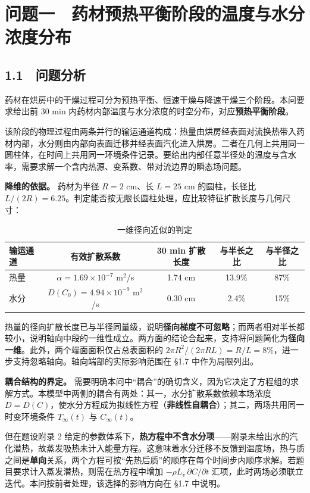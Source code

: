\documentclass[12pt,a4paper]{ctexart}
\begin{document}
\section*{问题一　药材预热平衡阶段的温度与水分浓度分布}

\subsection*{1.1　问题分析}

药材在烘房中的干燥过程可分为预热平衡、恒速干燥与降速干燥三个阶段。本问要求给出前 30 min 内药材内部温度与水分浓度的时空分布，对应\textbf{预热平衡阶段}。

该阶段的物理过程由两条并行的输运通道构成：热量由烘房经表面对流换热带入药材内部，水分则由内部向表面迁移并经表面汽化进入烘房。二者在几何上共用同一圆柱体，在时间上共用同一环境条件记录。要给出内部任意半径处的温度与含水率，需要求解一个含内热源、变系数、带对流边界的瞬态场问题。

\textbf{降维的依据。} 药材为半径 $R=2$ cm、长 $L=25$ cm 的圆柱，长径比 $L/(2R)=6.25$。判定能否按无限长圆柱处理，应比较特征扩散长度与几何尺寸：

\begin{table}[H]
\centering
\caption{一维径向近似的判定}
\small
\begin{tabular}{lcc c c}
\toprule
输运通道 & 有效扩散系数 & 30 min 扩散长度 & 与半长之比 & 与半径之比 \\
\midrule
热量 & $\alpha=1.69\times10^{-7}$ m$^2$/s & 1.74 cm & 13.9\% & 87\% \\
水分 & $D(C_0)=4.94\times10^{-9}$ m$^2$/s & 0.30 cm & 2.4\% & 15\% \\
\bottomrule
\end{tabular}
\end{table}

热量的径向扩散长度已与半径同量级，说明\textbf{径向梯度不可忽略}；而两者相对半长都较小，说明轴向中段的一维性成立。两方面的结论合起来，支持将问题简化为\textbf{径向一维}。此外，两个端面面积仅占总表面积的 $2\pi R^2/(2\pi RL)=R/L=8\%$，进一步支持忽略轴向。轴向端部的实际影响范围在 §1.7 中作为局限列出。

\textbf{耦合结构的界定。} 需要明确本问中“耦合”的确切含义，因为它决定了方程组的求解方式。本模型中两侧的耦合有两处：其一，水分扩散系数依赖本场浓度 $D=D(C)$，使水分方程成为拟线性方程（\textbf{非线性自耦合}）；其二，两场共用同一时变环境条件 $T_\infty(t)$ 与 $C_\infty(t)$。

但在题设附录 2 给定的参数体系下，\textbf{热方程中不含水分项}——附录未给出水的汽化潜热，故蒸发吸热未计入能量方程。这意味着水分迁移不反馈到温度场，热与质之间是\textbf{单向}关系，两个方程可按“先热后质”的顺序在每个时间步内顺序求解。若题目要求计入蒸发潜热，则需在热方程中增加 $-\rho L_v\,\partial C/\partial t$ 汇项，此时两场必须联立迭代。本问按前者处理，该选择的影响方向在 §1.7 中说明。
\end{document}
